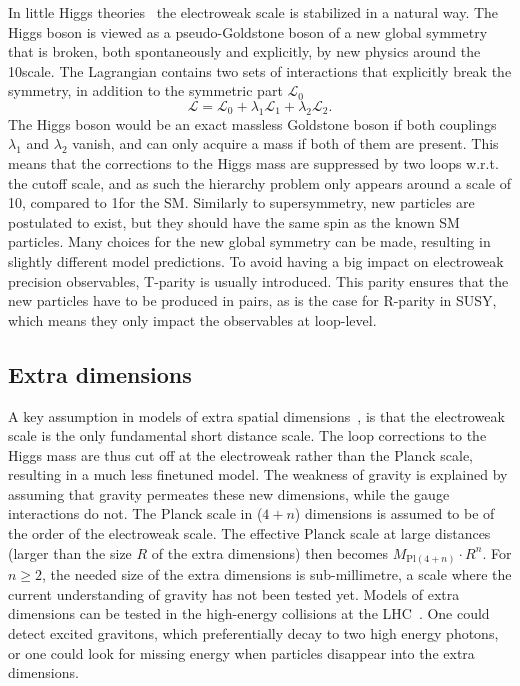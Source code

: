 In little Higgs theories~\cite{Cheng:2007bu,Reuter:2012sd,Schmaltz:2005ky} the electroweak scale is
stabilized in a natural way. 
The Higgs boson is viewed as a pseudo-Goldstone boson of a new global symmetry that is broken,
both spontaneously and explicitly, by new physics around the 10\TeV scale. 
The Lagrangian contains two sets of interactions that explicitly break the symmetry, in addition to
the symmetric part $\mathcal{L}_0$
\begin{equation}
  \mathcal{L} = \mathcal{L}_0 + \lambda_1 \mathcal{L}_1 + \lambda_2 \mathcal{L}_2 .
\end{equation}
The Higgs boson would be an exact massless Goldstone boson if both couplings $\lambda_1$ and
$\lambda_2$ vanish, and can only acquire a mass if both of them are present. This means that
the corrections to the Higgs mass are suppressed by two loops w.r.t. the cutoff scale, and as such
the hierarchy problem only appears around a scale of 10\TeV, compared to 1\TeV for the SM. 
Similarly to supersymmetry, new particles are postulated to exist, but they should have the same 
spin as the known SM particles. 
Many choices for the new global symmetry can be made, resulting in slightly different model
predictions. To avoid having a big impact on electroweak precision observables, T-parity is usually
introduced. This parity ensures that the new particles have to be produced in pairs, as is the case
for R-parity in SUSY, which means they only impact the observables at loop-level. 

\subsection{Extra dimensions \label{sec:extra_dimensions}}

A key assumption in models of extra spatial dimensions~\cite{ArkaniHamed:1998rs}, is that the
electroweak scale is the only fundamental short distance scale. The loop corrections to the Higgs
mass are thus cut off at the electroweak rather than the Planck scale, resulting in a much less
finetuned model.  
The weakness of gravity is explained by assuming that gravity permeates these new dimensions, while
the gauge interactions do not. 
The Planck scale in ($4+n$) dimensions is assumed to be of the order of the electroweak scale.  
The effective Planck scale at large distances (larger than the size $R$ of the extra dimensions)
then becomes $M_{\text{Pl}(4+n)}\cdot R^n$. For $n\geq 2$, the needed size of the extra dimensions
is sub-millimetre, a scale where the current understanding of gravity has not been tested yet. 
Models of extra dimensions can be tested in the high-energy collisions at the
LHC~\cite{Chatrchyan:2011fq}. One could detect excited gravitons, which preferentially decay to two
high energy photons, or one could look for missing energy when particles disappear into the extra
dimensions. 
